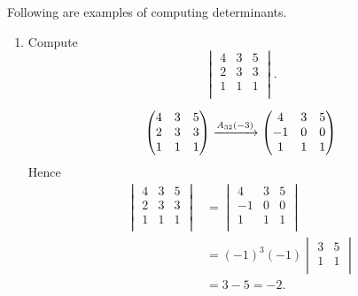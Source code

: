 \begin{example}
    Following are examples of computing determinants.
    
    \begin{enumerate}
        \item Compute
        \[
            \begin{vmatrix}
                4&3&5\\
                2&3&3\\
                1&1&1\\
            \end{vmatrix}
            .
        \]
        
        \[
            \begin{pmatrix}
                4&3&5\\
                2&3&3\\
                1&1&1\\
            \end{pmatrix}
            \eroarrow{A_{32}(-3)}{}
            \begin{pmatrix}
                4&3&5\\
                -1&0&0\\
                1&1&1\\
            \end{pmatrix}
        \]
        Hence
        \begin{align*}
            \begin{vmatrix}
                4&3&5\\
                2&3&3\\
                1&1&1\\
            \end{vmatrix}
            &=
            \begin{vmatrix}
                4&3&5\\
                -1&0&0\\
                1&1&1\\
            \end{vmatrix}\\
            &=(-1)^{3}(-1)
            \begin{vmatrix}
                3&5\\1&1\\
            \end{vmatrix}\\
            &=3-5=-2.
        \end{align*}
        

\end{enumerate}
\end{example}
